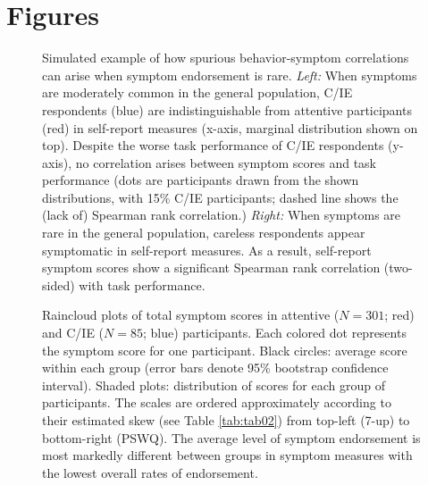 \documentclass[a4paper,notitlepage,12pt]{article}
\begin{document}
\clearpage
\section*{Figures}

\begin{figure}[h]
    \centering
    \caption{Simulated example of how spurious behavior-symptom correlations can arise when symptom endorsement is rare. \textit{Left:} When symptoms are moderately common in the general population, C/IE respondents (blue) are indistinguishable from attentive participants (red) in self-report measures (x-axis, marginal distribution shown on top). Despite the worse task performance of C/IE respondents (y-axis), no correlation arises between symptom scores and task performance (dots are participants drawn from the shown distributions, with 15\% C/IE participants; dashed line shows the (lack of) Spearman rank correlation.) \textit{Right:} When symptoms are rare in the general population, careless respondents appear symptomatic in self-report measures. As a result, self-report symptom scores show a significant Spearman rank correlation (two-sided) with task performance.}
    \label{fig:simulation}
\end{figure}

\clearpage
\begin{figure}[h]
    \centering
    \caption{Raincloud plots of total symptom scores in attentive ($N=301$; red) and C/IE ($N=85$; blue) participants. Each colored dot represents the symptom score for one participant. Black circles: average score within each group (error bars denote 95\% bootstrap confidence interval). Shaded plots: distribution of scores for each group of participants. The scales are ordered approximately according to their estimated skew (see Table \ref{tab:tab02}) from top-left (7-up) to bottom-right (PSWQ). The average level of symptom endorsement is most markedly different between groups in symptom measures with the lowest overall rates of endorsement.}
    \label{fig:fig01}
\end{figure}
\end{document}
